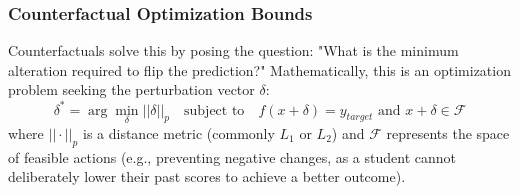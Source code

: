 \subsubsection{Counterfactual Optimization Bounds}
Counterfactuals solve this by posing the question: "What is the minimum alteration required to flip the prediction?" Mathematically, this is an optimization problem seeking the perturbation vector $\delta$:
\begin{equation}
    \delta^* = \arg \min_{\delta} || \delta ||_p \quad \text{subject to} \quad f(x + \delta) = y_{target} \text{ and } x+\delta \in \mathcal{F}
\end{equation}
where $|| \cdot ||_p$ is a distance metric (commonly $L_1$ or $L_2$) and $\mathcal{F}$ represents the space of feasible actions (e.g., preventing negative changes, as a student cannot deliberately lower their past scores to achieve a better outcome).


